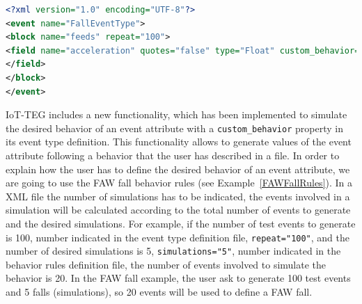 \documentclass[10pt,journal,compsoc]{IEEEtran}
\begin{document}
\begin{lstlisting}[basicstyle=\ttfamily\footnotesize,language=XML,caption={Fall event type definition},label=FallEvent, breaklines=true]
<?xml version="1.0" encoding="UTF-8"?>
<event name="FallEventType">
<block name="feeds" repeat="100">
<field name="acceleration" quotes="false" type="Float" custom_behavior="/Path/To/Rule/File">
</field>
</block>
</event>
\end{lstlisting}

IoT-TEG includes a new functionality, which has been implemented to simulate the desired behavior of an event attribute with a \texttt{custom\_behavior} property in its event type definition. This functionality allows to generate values of the event attribute following a behavior that the user has described in a file.
In order to explain how the user has to define the desired behavior of an event attribute, we are going to use the FAW fall behavior rules (see Example~\ref{FAWFallRules}). In a XML file the number of simulations has to be
indicated, the events involved in a simulation will be calculated according to the total number of events to generate and the desired simulations. For example, if the number of test events to generate is 100, number indicated in the event type definition file, \texttt{repeat="100"}, and the number of desired 
simulations is 5, \texttt{simulations="5"}, number indicated in the behavior rules definition file, the number of events involved to simulate the behavior is 20. In the FAW fall example, the user ask to generate 100 test events and 5 falls (simulations), so 20 events will be used to define a FAW fall.
\end{document}
